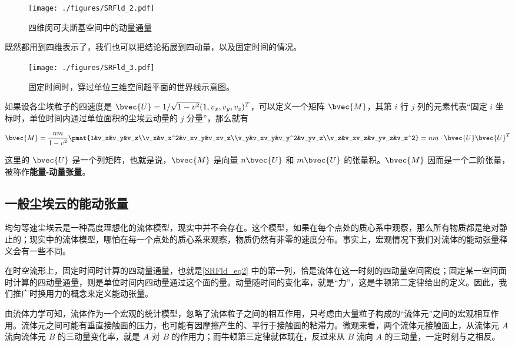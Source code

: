\begin{figure}[ht]
\centering
\texttt{[image: ./figures/SRFld\_2.pdf]}
\caption{四维闵可夫斯基空间中的动量通量} \label{SRFld_fig2}
\end{figure}

既然都用到四维表示了，我们也可以把结论拓展到四动量，以及固定时间的情况。

\begin{figure}[ht]
\centering
\texttt{[image: ./figures/SRFld\_3.pdf]}
\caption{固定时间时，穿过单位三维空间超平面的世界线示意图。} \label{SRFld_fig3}
\end{figure}

如果设各尘埃粒子的四速度是 $\bvec{U}=1/\sqrt{1-v^2}(1, v_x, v_y, v_z)^T$，可以定义一个矩阵 $\bvec{M}$，其第 $i$ 行 $j$ 列的元素代表“固定 $i$ 坐标时，单位时间内通过单位面积的尘埃云动量的 $j$ 分量”，那么就有

\begin{equation}\label{SRFld_eq2}
\bvec{M}=\frac{nm}{1-v^2}\pmat{1&v_x&v_y&v_z\\v_x&v_x^2&v_xv_y&v_xv_z\\v_y&v_xv_y&v_y^2&v_yv_z\\v_z&v_xv_z&v_yv_z&v_z^2}=nm\cdot\bvec{U}\bvec{U}^T
\end{equation}

这里的 $\bvec{U}$ 是一个列矩阵，也就是说，$\bvec{M}$ 是向量 $n\bvec{U}$ 和 $m\bvec{U}$ 的张量积。$\bvec{M}$ 因而是一个二阶张量，被称作\textbf{能量-动量张量}。


\subsection{一般尘埃云的能动张量}

均匀等速尘埃云是一种高度理想化的流体模型，现实中并不会存在。这个模型，如果在每个点处的质心系中观察，那么所有物质都是绝对静止的；现实中的流体模型，哪怕在每一个点处的质心系来观察，物质仍然有非零的速度分布。事实上，宏观情况下我们对流体的能动张量释义会有一些不同。

在时空流形上，固定时间时计算的四动量通量，也就是\autoref{SRFld_eq2} 中的第一列，恰是流体在这一时刻的四动量空间密度；固定某一空间面时计算的四动量通量，则是单位时间内四动量通过这个面的量。动量随时间的变化率，就是“力”，这是牛顿第二定律给出的定义。因此，我们推广时换用力的概念来定义能动张量。

由流体力学可知，流体作为一个宏观的统计模型，忽略了流体粒子之间的相互作用，只考虑由大量粒子构成的“流体元”之间的宏观相互作用。流体元之间可能有垂直接触面的压力，也可能有因摩擦产生的、平行于接触面的粘滞力。微观来看，两个流体元接触面上，从流体元 $A$ 流向流体元 $B$ 的三动量变化率，就是 $A$ 对 $B$ 的作用力；而牛顿第三定律就体现在，反过来从 $B$ 流向 $A$ 的三动量，一定时刻与之相反。


